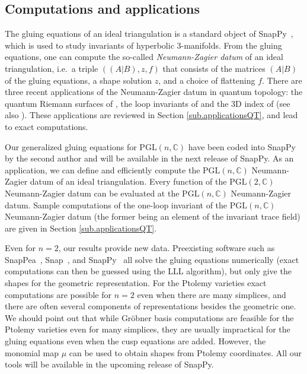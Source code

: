 \documentclass[12pt]{amsart}
\theoremstyle{definition}
\numberwithin{equation}{section}
\def\BC{\mathbb C}
\def\PGL{\mathrm{PGL}}
\begin{document}
\subsection{Computations and applications}
\label{sub.computations}

The gluing equations of an ideal triangulation is a standard object of 
SnapPy~\cite{SnapPy}, which is used to study invariants of hyperbolic $3$-manifolds. From the gluing equations, one can compute the so-called
\emph{Neumann-Zagier datum} of an ideal triangulation, i.e.~a triple $((A|B),z,f)$ that consists of the matrices $(A|B)$ of
the gluing equations, a shape solution $z$, and a choice of flattening $f$.
There are three recent applications of the Neumann-Zagier datum in quantum topology:
the quantum Riemann surfaces of \cite{Di1}, the loop invariants of \cite{DG}
and the 3D index of \cite{DGG2} (see also \cite{Ga-3Dindex}). These 
applications are reviewed in Section \ref{sub.applicationsQT}, and lead
to exact computations.

Our generalized gluing equations for $\PGL(n,\BC)$ have
been coded into SnapPy by the second author and will be available
in the next release of SnapPy. As an application, we can define and efficiently
compute the $\PGL(n,\BC)$ Neumann-Zagier datum of an ideal triangulation.
Every function of the $\PGL(2,\BC)$ Neumann-Zagier datum can be evaluated
at the $\PGL(n,\BC)$ Neumann-Zagier datum. Sample computations of the one-loop invariant
of the $\PGL(n,\BC)$ Neumann-Zagier datum (the former being an element
of the invariant trace field) are given in Section 
\ref{sub.applicationsQT}. 

Even for $n=2$, our results provide new data. Preexisting software such as SnapPea~\cite{SnapPea}, Snap~\cite{snapprogram}, and SnapPy~\cite{SnapPy} all solve the gluing equations numerically (exact computations can then be guessed using the LLL algorithm), but only give the shapes for the geometric representation. For the Ptolemy varieties exact computations are possible for $n=2$ even when there are many simplices, and there are often several components of representations besides the geometric one. We should point out that while Gr\"obner basis computations are feasible for the Ptolemy varieties even for many simplices, they are usually impractical for the gluing equations even when the cusp equations are added. However, the monomial map $\mu$ can be used to obtain shapes from Ptolemy coordinates. All our tools will be available in the upcoming release of SnapPy.
\end{document}
